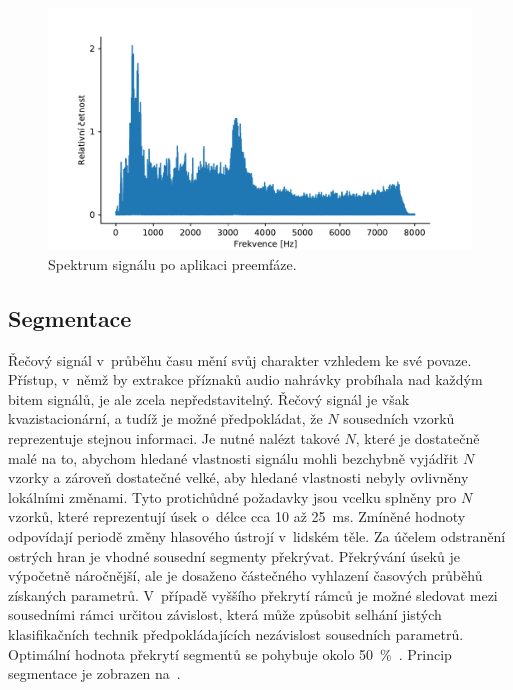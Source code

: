 \begin{figure}[ht!]
  \centering
  \includegraphics[width=\linewidth]{obrazky-figures/signal_spectrum_pre.pdf}
  \caption{Spektrum signálu po aplikaci preemfáze.}
  \label{fig:Signal_with_preemphasis}
\end{figure}

\subsection{Segmentace}
\label{subsection:Segmentation}
Řečový signál v~průběhu času mění svůj charakter vzhledem ke své povaze. Přístup, v~němž by extrakce příznaků audio nahrávky probíhala nad každým bitem signálů, je ale zcela nepředstavitelný. Řečový signál je však kvazistacionární, a tudíž je možné předpokládat, že $N$ sousedních vzorků reprezentuje stejnou informaci. Je nutné nalézt takové $N$, které je dostatečně malé na to, abychom hledané vlastnosti signálu mohli bezchybně vyjádřit $N$ vzorky a zároveň dostatečné velké, aby hledané vlastnosti nebyly ovlivněny lokálními změnami. Tyto protichůdné požadavky jsou vcelku splněny pro $N$ vzorků, které reprezentují úsek o~délce cca 10 až 25~ms. Zmíněné hodnoty odpovídají periodě změny hlasového ústrojí v~lidském těle. Za účelem odstranění ostrých hran je vhodné sousední segmenty překrývat. Překrývání úseků je výpočetně náročnější, ale je dosaženo částečného vyhlazení časových průběhů získaných parametrů. V~případě vyššího překrytí rámců je možné sledovat mezi sousedními rámci určitou závislost, která může způsobit selhání jistých klasifikačních technik předpokládajících nezávislost sousedních parametrů. Optimální hodnota překrytí segmentů se pohybuje okolo 50~\%~\cite{Sigmund_Analyza}. Princip segmentace je zobrazen na~.

